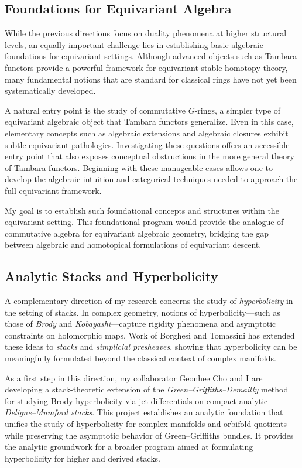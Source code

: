 \documentclass[11pt]{article}
\begin{document}
\subsection*{Foundations for Equivariant Algebra}
While the previous directions focus on duality phenomena at higher structural levels, an equally important challenge lies in establishing basic algebraic foundations for equivariant settings.
Although advanced objects such as Tambara functors provide a powerful framework for equivariant stable homotopy theory, many fundamental notions that are standard for classical rings have not yet been systematically developed.

A natural entry point is the study of commutative $G$-rings, a simpler type of equivariant algebraic object that Tambara functors generalize.
Even in this case, elementary concepts such as algebraic extensions and algebraic closures exhibit subtle equivariant pathologies.
Investigating these questions offers an accessible entry point that also exposes conceptual obstructions in the more general theory of Tambara functors.
Beginning with these manageable cases allows one to develop the algebraic intuition and categorical techniques needed to approach the full equivariant framework.

My goal is to establish such foundational concepts and structures within the equivariant setting.
This foundational program would provide the analogue of commutative algebra for equivariant algebraic geometry, bridging the gap between algebraic and homotopical formulations of equivariant descent.


\subsection*{Analytic Stacks and Hyperbolicity}
A complementary direction of my research concerns the study of {\it hyperbolicity} in the setting of stacks.
In complex geometry, notions of hyperbolicity—such as those of {\it Brody} and {\it Kobayashi}—capture rigidity phenomena and asymptotic constraints on holomorphic maps.
Work of Borghesi and Tomassini \cite{MR3673667} has extended these ideas to {\it stacks} and {\it simplicial presheaves}, showing that hyperbolicity can be meaningfully formulated beyond the classical context of complex manifolds.

As a first step in this direction, my collaborator Geonhee Cho and I are developing a stack-theoretic extension of the {\it Green–Griffiths–Demailly} method for studying Brody hyperbolicity via jet differentials on compact analytic {\it Deligne–Mumford stacks}.
This project establishes an analytic foundation that unifies the study of hyperbolicity for complex manifolds and orbifold quotients while preserving the asymptotic behavior of Green–Griffiths bundles.
It provides the analytic groundwork for a broader program aimed at formulating hyperbolicity for higher and derived stacks.
\end{document}
